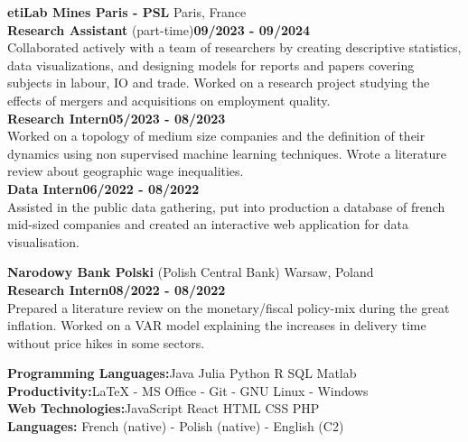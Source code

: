     \noindent\textbf{etiLab Mines Paris - PSL} \hfill Paris, France\\[0.1cm]
    \textbf{Research Assistant} (part-time)\hfill \textbf{09/2023 - 09/2024} \\
    Collaborated actively with a team of researchers by creating descriptive statistics, data visualizations, and designing models for reports and papers covering subjects in labour, IO and trade. Worked on a research project studying the effects of mergers and acquisitions on employment quality.\\
    \textbf{Research Intern}\hfill \textbf{05/2023 - 08/2023} \\
    Worked on a topology of medium size companies and the definition of their dynamics using non supervised machine learning techniques. Wrote a literature review about geographic wage inequalities.  \\[0.1cm]
    \textbf{Data Intern}\hfill \textbf{06/2022 - 08/2022} \\
    Assisted in the public data gathering, put into production a database of french mid-sized companies and created an interactive web application for data visualisation.

    \vspace{0.15cm}

    \noindent\textbf{Narodowy Bank Polski} (Polish Central Bank) \hfill Warsaw, Poland\\[0.1cm]
    \textbf{Research Intern}\hfill \textbf{08/2022  - 08/2022} \\
    Prepared a literature review on the monetary/fiscal policy-mix during the great inflation. Worked on a VAR model explaining the increases in delivery time without price hikes in some sectors. 

\begin{flushleft}
\raisebox{-.6ex}{SKILLS} \hrulefill
\end{flushleft}

    \noindent\textbf{Programming Languages:}\hfill{Java \tbar Julia \tbar Python \tbar R \tbar SQL \tbar Matlab} \\
    \textbf{Productivity:}\hfill LaTeX - MS Office - Git - GNU Linux - Windows\\
    \textbf{Web Technologies:}\hfill JavaScript \tbar React \tbar HTML \tbar CSS \tbar PHP  \\
    \textbf{Languages:} \hfill French (native) - Polish (native) - English (C2) 

\begin{flushleft}
\raisebox{-.6ex}{CONTRIBUTIONS` \& PROJECTS} \hrulefill
\end{flushleft}
	
